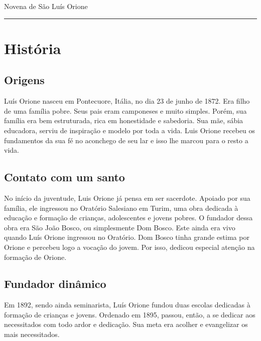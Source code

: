 \documentclass[a4paper,14pt]{extarticle} \usepackage[utf8]{inputenc}
\begin{document}


\begin{center}
  {\huge Novena de São Luís Orione}
\end{center}



\noindent\rule{\textwidth}{0.4pt}

\tableofcontents

\thispagestyle{empty}


\newpage

\section{História}

\subsection{Origens}

Luís Orione nasceu em Pontecuore, Itália, no dia 23 de junho de 1872. Era filho de uma família pobre. Seus pais eram camponeses e muito simples. Porém, sua família era bem estruturada, rica em honestidade e sabedoria. Sua mãe, sábia educadora, serviu de inspiração e modelo por toda a vida. Luis Orione recebeu os fundamentos da sua fé no aconchego de seu lar e isso lhe marcou para o resto a vida.

\subsection{Contato com um santo}

No início da juventude, Luis Orione já pensa em ser sacerdote. Apoiado por sua família, ele ingressou no Oratório Salesiano em Turim, uma obra dedicada à educação e formação de crianças, adolescentes e jovens pobres. O fundador dessa obra era São João Bosco, ou simplesmente Dom Bosco. Este ainda era vivo quando Luís Orione ingressou no Oratório. Dom Bosco tinha grande estima por Orione e percebeu logo a vocação do jovem. Por isso, dedicou especial atenção na formação de Orione.

\subsection{Fundador dinâmico }

Em 1892, sendo ainda seminarista, Luís Orione fundou duas escolas dedicadas à formação de crianças e jovens. Ordenado em 1895, passou, então, a se dedicar aos necessitados com todo ardor e dedicação. Sua meta era acolher e evangelizar os mais necessitados.
\end{document}
